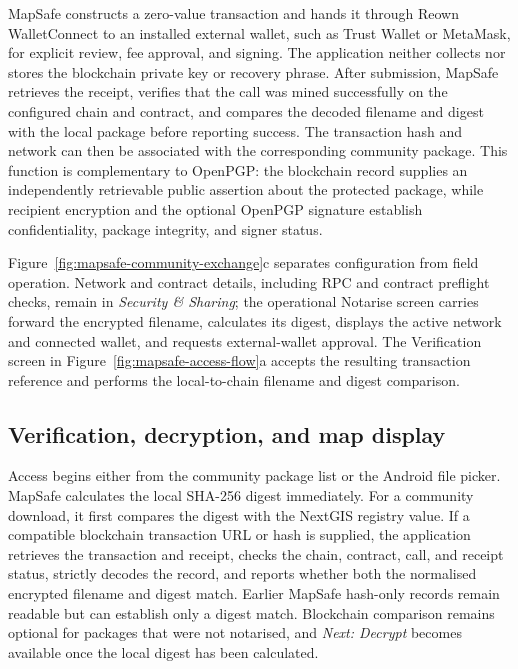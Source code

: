 \documentclass[a4paper,UKenglish,cleveref,autoref,thm-restate]{lipics-v2021}
\begin{document}
MapSafe constructs a zero-value transaction and hands it through Reown WalletConnect to an installed external wallet, such as Trust Wallet or MetaMask, for explicit review, fee approval, and signing. The application neither collects nor stores the blockchain private key or recovery phrase. After submission, MapSafe retrieves the receipt, verifies that the call was mined successfully on the configured chain and contract, and compares the decoded filename and digest with the local package before reporting success. The transaction hash and network can then be associated with the corresponding community package. This function is complementary to OpenPGP: the blockchain record supplies an independently retrievable public assertion about the protected package, while recipient encryption and the optional OpenPGP signature establish confidentiality, package integrity, and signer status.

Figure~\ref{fig:mapsafe-community-exchange}c separates configuration from field operation. Network and contract details, including RPC and contract preflight checks, remain in \emph{Security \& Sharing}; the operational Notarise screen carries forward the encrypted filename, calculates its digest, displays the active network and connected wallet, and requests external-wallet approval. The Verification screen in Figure~\ref{fig:mapsafe-access-flow}a accepts the resulting transaction reference and performs the local-to-chain filename and digest comparison.

\FloatBarrier
\subsection{Verification, decryption, and map display}
\label{sec:verification}

Access begins either from the community package list or the Android file picker. MapSafe calculates the local SHA-256 digest immediately. For a community download, it first compares the digest with the NextGIS registry value. If a compatible blockchain transaction URL or hash is supplied, the application retrieves the transaction and receipt, checks the chain, contract, call, and receipt status, strictly decodes the record, and reports whether both the normalised encrypted filename and digest match. Earlier MapSafe hash-only records remain readable but can establish only a digest match. Blockchain comparison remains optional for packages that were not notarised, and \emph{Next: Decrypt} becomes available once the local digest has been calculated.
\end{document}
